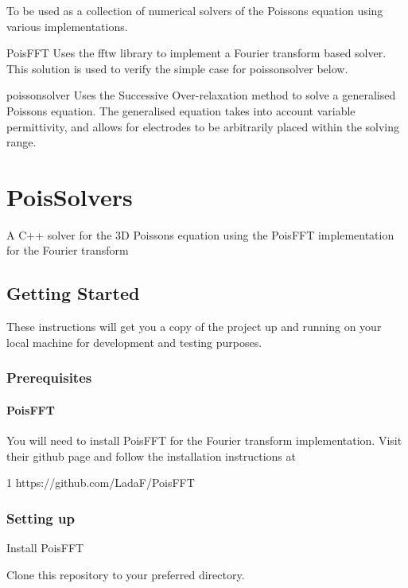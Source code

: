 To be used as a collection of numerical solvers of the Poisson\textquotesingle{}s equation using various implementations.

Pois\+F\+FT Uses the fftw library to implement a Fourier transform based solver. This solution is used to verify the simple case for poissonsolver below.

poissonsolver Uses the Successive Over-\/relaxation method to solve a generalised Poisson\textquotesingle{}s equation. The generalised equation takes into account variable permittivity, and allows for electrodes to be arbitrarily placed within the solving range.

\section*{Pois\+Solvers}

A C++ solver for the 3D Poisson\textquotesingle{}s equation using the Pois\+F\+FT implementation for the Fourier transform

\subsection*{Getting Started}

These instructions will get you a copy of the project up and running on your local machine for development and testing purposes.

\subsubsection*{Prerequisites}

\paragraph*{Pois\+F\+FT}

You will need to install Pois\+F\+FT for the Fourier transform implementation. Visit their github page and follow the installation instructions at


\begin{DoxyCode}
1 https://github.com/LadaF/PoisFFT
\end{DoxyCode}


\subsubsection*{Setting up}


\begin{DoxyEnumerate}
\item Install Pois\+F\+FT
\item Clone this repository to your preferred directory.
\end{DoxyEnumerate}

